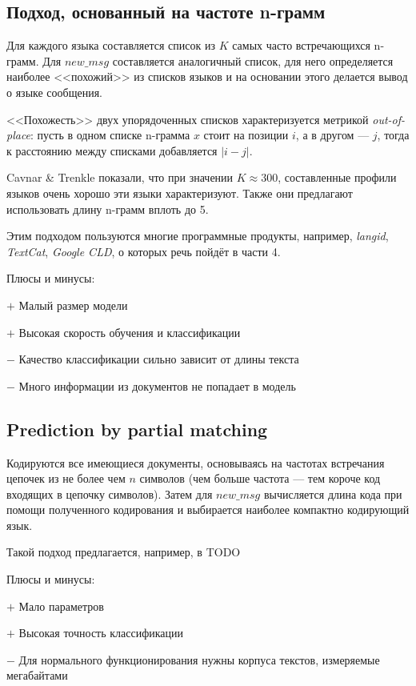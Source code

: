 \documentclass[a4paper, 14pt]{article}
\begin{document}
		\subsection{Подход, основанный на частоте n-грамм}
		Для каждого языка составляется список из $K$ самых часто встречающихся n-грамм. Для $new\_msg$ составляется аналогичный список, для него
		определяется наиболее <<похожий>> из списков языков
		и на основании этого делается вывод о языке сообщения. 
		
		<<Похожесть>> двух упорядоченных списков характеризуется метрикой \textit{out-of-place}: 
		пусть в одном списке n-грамма $x$ стоит на позиции $i$, а в другом \nolinebreak --- $j$, тогда к расстоянию между списками добавляется $|i - j|$.
		
		
		Cavnar \& Trenkle показали, что при значении $K \approx 300$, составленные 
		профили языков очень хорошо эти языки характеризуют. Также они предлагают использовать длину n-грамм вплоть до 5.
		
		Этим подходом пользуются многие программные продукты, например, \textit{langid}, \textit{TextCat}, \textit{Google CLD}, о которых речь пойдёт
		в части 4.
		
		\noindent Плюсы и минусы:
		
		
		$+$ Малый размер модели
		
		$+$ Высокая скорость обучения и классификации
		
		$-$ Качество классификации сильно зависит от длины текста
		
		$-$ Много информации из документов не попадает в модель
		
		\subsection{Prediction by partial matching}
		Кодируются все имеющиеся документы, основываясь на частотах встречания цепочек из не более чем $n$ символов (чем больше частота --- тем короче
		код входящих в цепочку символов). Затем для $new\_msg$ вычисляется длина кода при помощи полученного кодирования и выбирается наиболее
		компактно кодирующий язык.
		
		Такой подход предлагается, например, в TODO
		
		\noindent Плюсы и минусы:
		
		$+$ 	Мало параметров
		
		$+$ Высокая точность классификации
		
		$-$ Для нормального функционирования нужны корпуса текстов, измеряемые мегабайтами
		
\end{document}
